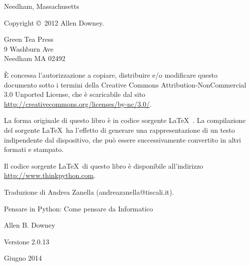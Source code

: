 \documentclass[10pt]{book}
\newcommand{\thetitle}{Pensare in Python: Come pensare da Informatico}
\newcommand{\theversion}{2.0.13}
\newcommand{\thedate}{Giugno 2014}
\begin{document}
\begin{latexonly}
\begin{flushright}
{\small Needham, Massachusetts}

\vfill

\end{flushright}


\pagebreak
\thispagestyle{empty}

{\small
Copyright \copyright ~2012 Allen Downey.


\vspace{0.2in}

\begin{flushleft}
Green Tea Press       \\
9 Washburn Ave        \\
Needham MA 02492
\end{flushleft}

È concessa l'autorizzazione a copiare, distribuire e/o modificare questo documento sotto i termini della Creative Commons Attribution-NonCommercial 3.0 Unported License, che è scaricabile dal sito \url{http://creativecommons.org/licenses/by-nc/3.0/}.

La forma originale di questo libro è in codice sorgente \LaTeX\ . La compilazione del sorgente \LaTeX\ ha l'effetto di generare una rappresentazione di un testo indipendente dal dispositivo, che può essere successivamente convertito in altri formati e stampato.

Il codice sorgente \LaTeX\ di questo libro è disponibile all'indirizzo
\url{http://www.thinkpython.com}.

\vspace{0.2in}
Traduzione di Andrea Zanella (andreazanella@tiscali.it).


\vspace{0.2in}

} %

\end{latexonly}



\begin{htmlonly}


{\Large \thetitle}

{\large Allen B. Downey}

Versione \theversion

\thedate

\setcounter{chapter}{-1}

\end{htmlonly}
\end{document}
